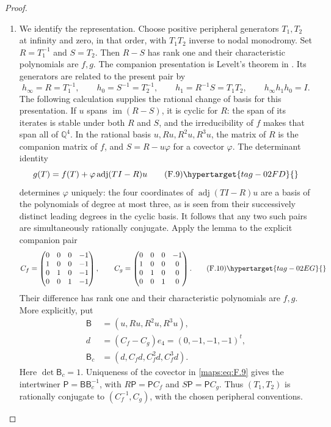 \begin{proof}
\begin{enumerate}[label={$\langle1\rangle$\arabic*.}]
\item We identify the representation.
Choose positive peripheral generators $T_1,T_2$ at infinity and
zero, in that order, with $T_1T_2$ inverse to nodal monodromy.
Set $R=T_1^{-1}$ and $S=T_2$.  Then $R-S$ has rank one and their
characteristic polynomials are $f,g$.  The companion presentation
is Levelt's theorem in \cite[Theorem 3.5, pp.~331--332;
Corollary 3.6, p.~332]{BeukersHeckman1989}.  Its generators are
related to the present pair by
\[
 h_\infty=R=T_1^{-1},\qquad h_0=S^{-1}=T_2^{-1},\qquad
 h_1=R^{-1}S=T_1T_2,\qquad h_\infty h_1h_0=I.
\]
The following calculation supplies the rational change
of basis for this presentation.
If $u$ spans $\operatorname{im}(R-S)$, it is cyclic for $R$:
the span of its iterates is stable under both $R$ and $S$, and
the irreducibility of $f$ makes that span all of $\mathbb Q^4$.
In the rational basis $u,Ru,R^2u,R^3u$, the matrix of $R$ is
the companion matrix of $f$, and $S=R-u\varphi$ for a covector
$\varphi$.  The determinant identity
\[
 g(T)=f(T)+\varphi\operatorname{adj}(TI-R)u
 \tag{F.9}\hypertarget{tag-02FD}{}\label{maps:eq:F.9}
\]
determines $\varphi$ uniquely: the four coordinates of
$\operatorname{adj}(TI-R)u$ are a basis of the polynomials of
degree at most three, as is seen from their successively distinct
leading degrees in the cyclic basis.  It follows that any two
such pairs are simultaneously rationally conjugate.  Apply the
lemma to the explicit companion pair
\[
 C_f=\begin{pmatrix}
 0&0&0&-1\\1&0&0&-1\\0&1&0&-1\\0&0&1&-1
 \end{pmatrix},\qquad
 C_g=\begin{pmatrix}
 0&0&0&-1\\1&0&0&0\\0&1&0&0\\0&0&1&0
 \end{pmatrix}.
 \tag{F.10}\hypertarget{tag-02EG}{}\label{maps:eq:F.10}
\]
Their difference has rank one and their characteristic polynomials
are $f,g$.  More explicitly, put
\[
 \begin{aligned}
 \mathsf B&=(u,Ru,R^2u,R^3u),\\
 d&=(C_f-C_g)e_4=(0,-1,-1,-1)^t,\\
 \mathsf B_c&=(d,C_fd,C_f^2d,C_f^3d).
 \end{aligned}
\]
Here $\det\mathsf B_c=1$.  Uniqueness of the covector in
\eqref{maps:eq:F.9} gives the intertwiner
$\mathsf P=\mathsf B\mathsf B_c^{-1}$, with
$R\mathsf P=\mathsf P C_f$ and $S\mathsf P=\mathsf P C_g$.
Thus $(T_1,T_2)$ is rationally conjugate to
$(C_f^{-1},C_g)$, with the chosen peripheral conventions.


\end{enumerate}
\end{proof}
